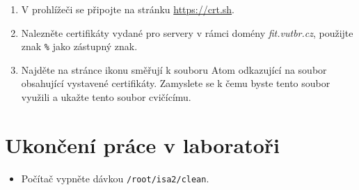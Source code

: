\documentclass[a4paper,11pt]{article}
\begin{document}
\begin{enumerate}
\begin{enumerate}
      \item V prohlížeči se připojte na stránku \url{https://crt.sh}.

      \item Nalezněte certifikáty vydané pro servery v rámci domény
        \emph{fit.vutbr.cz}, použijte znak \verb|%| jako zástupný znak.

      \item Najděte na stránce ikonu směřují k souboru Atom odkazující na soubor
        obsahující vystavené certifikáty. Zamyslete se k čemu byste tento soubor
        využili a ukažte tento soubor cvičícímu.

    \end{enumerate}

\end{enumerate}


\section{Ukončení práce v laboratoři}
\begin{itemize}
  \item Počítač vypněte dávkou {\tt /root/isa2/clean}.
\end{itemize}
\end{document}
